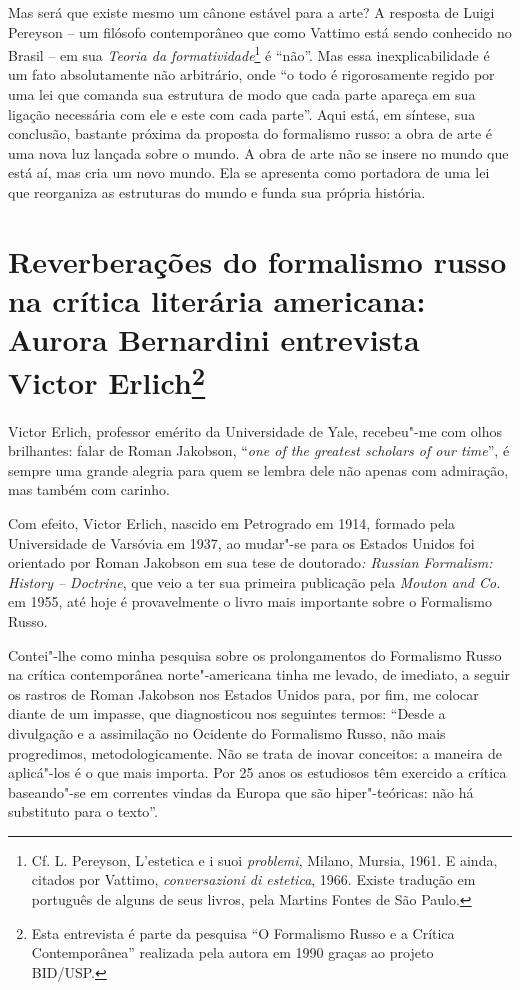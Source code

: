 Mas será que existe mesmo um cânone estável para a arte? A resposta de
Luigi Pereyson -- um filósofo contemporâneo que como Vattimo está sendo
conhecido no Brasil -- em sua \emph{Teoria da formatividade}\footnote{Cf.
  L. Pereyson, L'estetica e i suoi \emph{problemi}, Milano, Mursia,
  1961. E ainda, citados por Vattimo, \emph{conversazioni di estetica},
  1966. Existe tradução em português de alguns de seus livros, pela
  Martins Fontes de São Paulo.} é ``não''. Mas essa inexplicabilidade é
um fato absolutamente não arbitrário, onde ``o todo é rigorosamente
regido por uma lei que comanda sua estrutura de modo que cada parte
apareça em sua ligação necessária com ele e este com cada parte''. Aqui
está, em síntese, sua conclusão, bastante próxima da proposta do
formalismo russo: a obra de arte é uma nova luz lançada sobre o mundo. A
obra de arte não se insere no mundo que está aí, mas cria um novo mundo.
Ela se apresenta como portadora de uma lei que reorganiza as estruturas
do mundo e funda sua própria história.

\chapter{Reverberações do formalismo russo na crítica literária americana: 
Aurora Bernardini entrevista Victor Erlich\footnote{Esta
  entrevista é parte da pesquisa ``O Formalismo Russo e a Crítica
  Contemporânea'' realizada pela autora em 1990 graças ao projeto
  BID/USP.}}

Victor Erlich, professor emérito da Universidade de Yale, recebeu"-me com
olhos brilhantes: falar de Roman Jakobson, ``\emph{one of the greatest
scholars of our time}'', é sempre uma grande alegria para quem se lembra
dele não apenas com admiração, mas também com carinho.

Com efeito, Victor Erlich, nascido em Petrogrado em 1914, formado pela
Universidade de Varsóvia em 1937, ao mudar"-se para os Estados Unidos foi
orientado por Roman Jakobson em sua tese de doutorado\emph{: Russian
Formalism: History -- Doctrine}, que veio a ter sua primeira publicação
pela \emph{Mouton and Co.} em 1955, até hoje é provavelmente o livro
mais importante sobre o Formalismo Russo.

Contei"-lhe como minha pesquisa sobre os prolongamentos do Formalismo
Russo na crítica contemporânea norte"-americana tinha me levado, de
imediato, a seguir os rastros de Roman Jakobson nos Estados Unidos para,
por fim, me colocar diante de um impasse, que diagnosticou nos seguintes
termos: ``Desde a divulgação e a assimilação no Ocidente do Formalismo
Russo, não mais progredimos, metodologicamente. Não se trata de inovar
conceitos: a maneira de aplicá"-los é o que mais importa. Por 25 anos os
estudiosos têm exercido a crítica baseando"-se em correntes vindas da
Europa que são hiper"-teóricas: não há substituto para o texto''.

